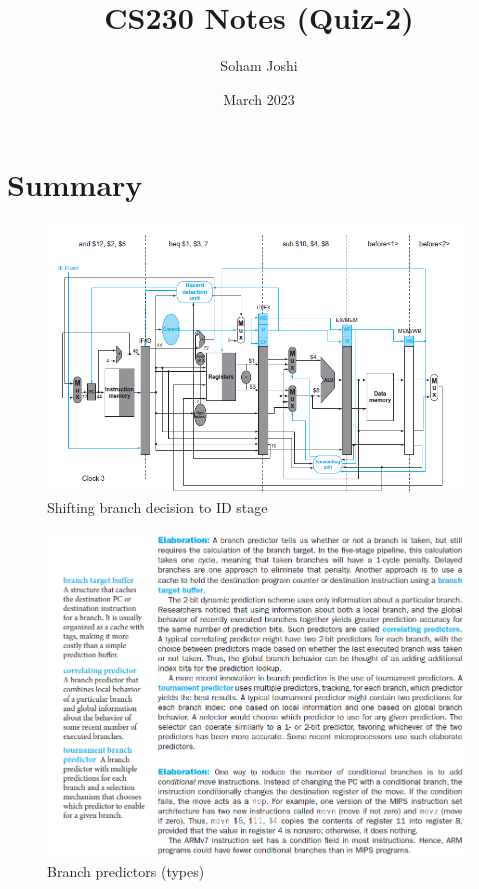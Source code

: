 \documentclass{scrartcl}
\title{CS230 Notes (Quiz-2)}
\author{Soham Joshi}
\date{March 2023}
\begin{document}
\maketitle

\section{Summary}

\begin{figure}[h]
\centering
\includegraphics[scale=0.8]{Images/branch_dec_to_ID.png}
\caption{Shifting branch decision to ID stage}
\end{figure}

\begin{figure}[h]
\centering
\includegraphics[scale=0.6]{Images/BTB_predictors.png}
\caption{Branch predictors (types)}
\end{figure}
\end{document}
